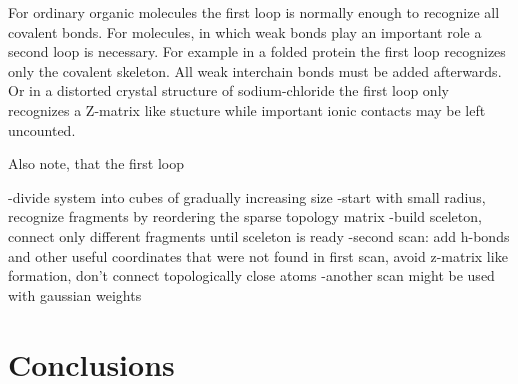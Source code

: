 \documentclass[prl,aps,preprint,superbib,12pt]{revtex4}
\begin{document}
For ordinary organic molecules the first loop is normally
enough to recognize all covalent bonds. For molecules, in which 
weak bonds play an important role a second loop is necessary. 
For example in a folded protein the first loop recognizes only
the covalent skeleton. All weak interchain bonds must be added
afterwards. Or in a distorted crystal structure of sodium-chloride
the first loop only recognizes a Z-matrix like stucture while
important ionic contacts may be left uncounted.

Also note, that the first loop

-divide system into cubes of gradually increasing size
-start with small radius, recognize fragments by reordering
the sparse topology matrix
-build sceleton, connect only different fragments until sceleton is ready
-second scan: add h-bonds and other useful coordinates that were not found in first scan, avoid z-matrix like formation, don't connect topologically close atoms
-another scan might be used with gaussian weights

\section{Conclusions} \label{Conclusions}


\end{document}
